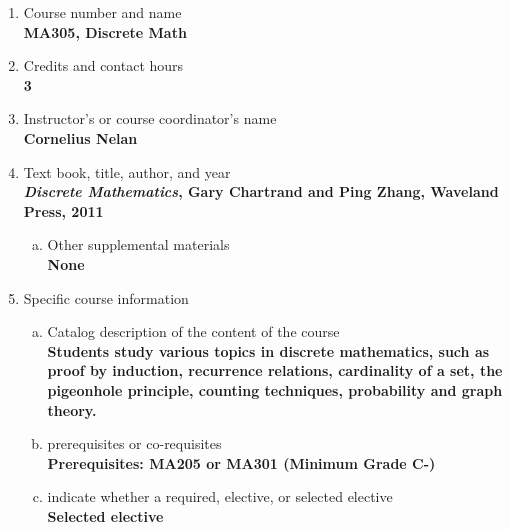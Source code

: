 \label{MA305}  %
\begin{enumerate}[1.]
\item Course number and name\\
  {\bfseries
    MA305, Discrete Math
  }
  
\item Credits and contact hours\\
  {\bfseries
    3  %
  }

\item Instructor's or course coordinator's name\\
  {\bfseries
    Cornelius Nelan
  }

\item Text book, title, author, and year\\
  {\bfseries
{\em Discrete Mathematics}, Gary Chartrand and Ping Zhang, Waveland Press, 2011    
  }
\begin{enumerate}[a.]
\item Other supplemental materials\\
  {\bfseries
    None    
  }
\end{enumerate}

\item Specific course information
\begin{enumerate}[a.]  
\item Catalog description of the content of the course\\
  {\bfseries
Students study various topics in discrete mathematics, such as proof by induction, recurrence relations, cardinality of a set, the pigeonhole principle, counting techniques, probability and graph theory.
}

\item prerequisites or co-requisites\\
  {\bfseries
    Prerequisites: MA205 or MA301 (Minimum Grade C-) %
  }

\item indicate whether a required, elective, or selected elective\\ %
  {\bfseries
    Selected elective
  }


\end{enumerate}
\end{enumerate}

